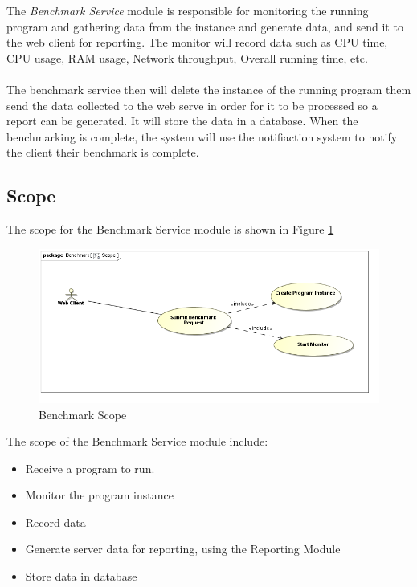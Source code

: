 The \textit{Benchmark Service} module is responsible for monitoring the running
program and gathering data from the instance and generate data, and send it to
the web client for reporting. The monitor will record data such as CPU time,
CPU usage, RAM usage, Network throughput, Overall running time, etc.
\\
\\
The benchmark service then will delete the instance of the running program them
send the data collected to the web serve in order for it to be processed so a
report can be generated. It will store the data in a database. When the benchmarking
is complete, the system will use the notifiaction system to notify the client their
benchmark is complete.


\subsection{Scope}
The scope for the Benchmark Service module is shown in Figure \ref{Benchmark Scope}
\begin{figure}[H]
  \begin{center}
  \includegraphics[scale=0.5]{../Diagrams and Charts/Benchmark/Scope.png}
  \caption{Benchmark Scope}
  \end{center}
  \label{Benchmark Scope}
\end{figure}
The scope of the Benchmark Service module include:
\begin{itemize}
	\item Receive a program to run.
  \item Monitor the program instance
  \item Record data
  \item Generate server data for reporting, using the Reporting Module
  \item Store data in database
\end{itemize}

